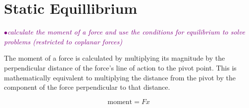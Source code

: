 \documentclass[a4paper,11pt,twoside]{memoir}
\newcounter{spec}[chapter]
\newcommand{\spec}[1]{\Needspace{5\baselineskip}\textcolor{purple}{$\bullet$\hspace{0.5cm}\textit{#1}}}
\begin{document}
\section{Static Equillibrium}

\spec{calculate the moment of a force and use the conditions for equilibrium to solve problems (restricted to
	coplanar forces)}

The moment of a force is calculated by multiplying its magnitude by the perpendicular distance of the force's line of action to the pivot point. This is mathematically equivalent to multiplying the distance from the pivot by the component of the force perpendicular to that distance.

\begin{figure}[h]
	\centering
	$$\mathrm{moment} = Fx $$
\end{figure}
\end{document}
